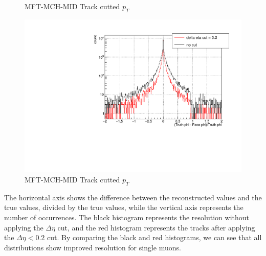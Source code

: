 \begin{figure}[htbp]
\begin{minipage}{0.3\textwidth}
                        \caption{MFT-MCH-MID Track cutted $p_T$}
                        \label{Analysis:Matching:eta resolution}
                    \end{minipage}
                    \begin{minipage}{0.3\textwidth}
                        \centering
                        \includegraphics[width=\textwidth]{fig/3_3_phi_resolution.pdf} %
                        \caption{MFT-MCH-MID Track cutted $p_T$}
                        \label{Analysis:Matching:phi resolution}
                    \end{minipage}
                \end{figure}
                The horizontal axis shows the difference between the reconstructed values and the true values, divided by the true values, while the vertical axis represents the number of occurrences. The black histogram represents the resolution without applying the $\Delta \eta$ cut, and the red histogram represents the tracks after applying the $\Delta \eta < 0.2$ cut. By comparing the black and red histograms, we can see that all distributions show improved resolution for single muons.%
